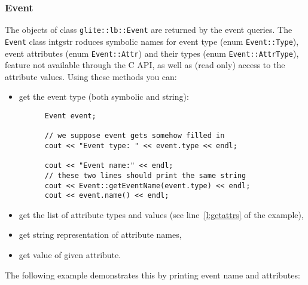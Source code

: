\subsubsection{Event}
The objects of class \verb'glite::lb::Event' are returned by the \LB event
queries. The \verb'Event' class intgstr	roduces symbolic names for event
type (enum \verb'Event::Type'), event attributes (enum
\verb'Event::Attr') and their types (enum
\verb'Event::AttrType'), feature not available through the C API, as
well as (read only) access to the attribute values.  Using 
these methods you can:
\begin{itemize}
\item get the event type (both symbolic and string):
\begin{lstlisting}
      Event event;

      // we suppose event gets somehow filled in
      cout << "Event type: " << event.type << endl;
   
      cout << "Event name:" << endl;
      // these two lines should print the same string
      cout << Event::getEventName(event.type) << endl;
      cout << event.name() << endl;
\end{lstlisting}
\item get the list of attribute types and values (see
line~\ref{l:getattrs} of the example),
\item get string representation of attribute names,
\item get value of given attribute.
\end{itemize}
The following example demonstrates this by printing event name and attributes:


